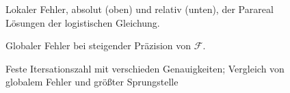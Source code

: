\begin{figure}[ht]
    \centering
        
        
    \caption{Lokaler Fehler, absolut (oben) und relativ (unten), der Parareal Lösungen der logistischen Gleichung.}
    \label{fig:iter_error_local}
\end{figure}

\begin{figure}[ht]
    \centering
        
    \caption{Globaler Fehler bei steigender Präzision von \(\mathcal{F}\).}
    \label{fig:iter_error}
\end{figure}

\begin{figure}[ht]
    \centering
        
    \caption{Feste Itersationszahl mit verschieden Genauigkeiten; Vergleich von globalem Fehler und größter Sprungstelle}
    \label{fig:iter_error}
\end{figure}
